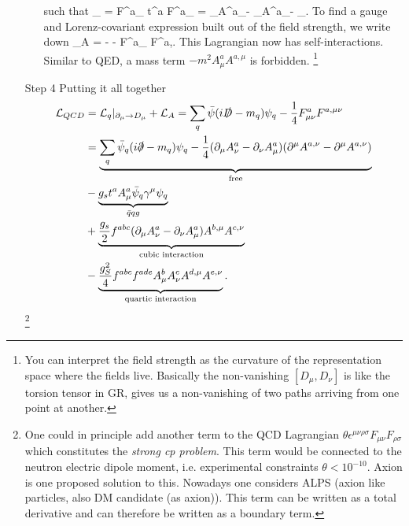 \begin{enumerate}
\begin{enumerate}
		\ese 
		such that
		\bse 
		\mF_{\mu \nu} = F^a_{\mu \nu} t^a \rightarrow F^a_{\mu \nu} = \partial_\mu A^a_\nu - \partial_\nu A^a_\mu - _{}.
		\ese 
		To find a gauge and Lorenz-covariant expression built out of the field strength, we write down
		\be
		\mL_A = -  \Tr \left[ \mF_{\mu \nu} \mF^{\mu \nu}\right] -  F^a_{\mu \nu} F^{a,\mu \nu}. 
		\ee 
		This Lagrangian now has self-interactions. Similar to QED, a mass term $-m^2 A^a_\mu A^{a,\mu}$ is forbidden.
		\footnote{
		You can interpret the field strength as the curvature of the representation space where the fields live. Basically the non-vanishing $[D_\mu,D_\nu]$ is like the torsion tensor in GR, gives us a non-vanishing of two paths arriving from one point at another.}
	\end{enumerate}
	\item[Step 4] Putting it all together
	\begin{align*}
		\mathcal{L}_{QCD} &= \mathcal{L}_{q}|_{\partial_\mu \rightarrow D_\mu} + \mathcal{L}_A = \sum_q \bar{\psi} (i \slashed{D}-m_q) \psi_q - \frac{1}{4}F^a_{\mu \nu} F^{a,\mu \nu} \\
		&=\underbrace{  \sum_q \bar{\psi}_q (i\slashed{\partial} -m_q)\psi_q - \frac{1}{4} (\partial_\mu A^a_\nu -\partial_\nu A^a_\mu) (\partial^\mu A^{a,\nu} -\partial^\mu A^{a,\nu}) }_{\text{free}} \\
		&- \underbrace{g_s t^a A^a_\mu \bar{\psi}_q \gamma^\mu \psi_q}_{\bar{q} q g} \\
		&+\underbrace{  \frac{g_s}{2} f^{abc} (\partial_\mu A^a_\nu - \partial_\nu A^a_\mu ) A^{b,\mu} A^{c,\nu}}_{\text{cubic interaction}} \\
		&- \underbrace{\frac{g^2_S}{4} f^{abc} f^{ade} A^b_\mu A^c_\nu A^{d,\mu} A^{e,\nu}}_{\text{quartic interaction}}.
	\end{align*}
	\footnote{
	One could in principle add another term to the QCD Lagrangian $
	\theta \epsilon^{\mu \nu \rho \sigma} F_{\mu \nu} F_{\rho \sigma}$
	which constitutes the \emph{strong cp problem}. This term would be connected to the neutron electric dipole moment, i.e. experimental constraints $\theta <10^{-10}$. Axion is one proposed solution to this. Nowadays one considers ALPS (axion like particles, also DM candidate (as axion)). This term can be written as a total derivative and can therefore be written as a boundary term.}
\end{enumerate}

 



























